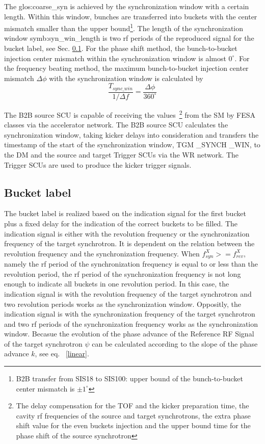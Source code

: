 The \gls{glos:coarse_syn} is achieved by the synchronization window with a certain length. Within this window, bunches are transferred into buckets with the center mismatch smaller than the upper bound\footnote{B2B transfer from SIS18 to SIS100: upper bound of the bunch-to-bucket center mismatch is $\pm1^\circ$}. The length of the synchronization window \gls{symb:syn_win_length} is two rf periods of the reproduced signal for the bucket label, see Sec. \ref{sec:bucket_label}. For the phase shift method, the bunch-to-bucket injection center mismatch within the synchronization window is almost $0^\circ$. For the frequency beating method, the maximum bunch-to-bucket injection center mismatch $\Delta \phi$ with the synchronization window is calculated by 
\begin{equation}
\frac{T_{\mathit{sync\_win}}}{1/\Delta f}= \frac{\Delta \phi}{360^\circ}
\end{equation}

The B2B source SCU is capable of receiving the values~\footnote{The delay compensation for the TOF and the kicker preparation time, the cavity rf frequencies of the source and target synchrotrons, the extra phase shift value for the even buckets injection and the upper bound time for the phase shift of the source synchrotron} from the SM by FESA classes via the accelerator network. The B2B source SCU calculates the synchronization window, taking kicker delays into consideration and transfers the timestamp of the start of the synchronization window, TGM \_SYNCH \_WIN, to the DM and the source and target Trigger SCUs via the WR network. The Trigger SCUs are used to produce the kicker trigger signals. 

\subsection{Bucket label}
\label{sec:bucket_label}
The bucket label is realized based on the indication signal for the first bucket plus a fixed delay for the indication of the correct buckets to be filled. The indication signal is either with the revolution frequency or the synchronization frequency of the target synchrotron. It is dependent on the relation between the revolution frequency and the synchronization frequency.  When $f_{\mathit{syn}}^{X}>=f_{\mathit{rev}}^{X}$, namely the rf period of the synchronization frequency is equal to or less than the revolution period, the  rf period of the synchronization frequency is not long enough to indicate all buckets in one revolution period. In this case, the indication signal is with the revolution frequency of the target synchrotron and two revolution periods works as the synchronization window. Oppositly, the indication signal is with the synchronization frequency of the target synchrotron and two rf periods of the synchronization frequency works as the synchronization window.  Becasue the evolution of the phase advance of the Reference RF Signal of the target synchrotron $\psi$ can be calculated according to the slope of the phase advance $k$, see eq. ~\ref{linear}.  

